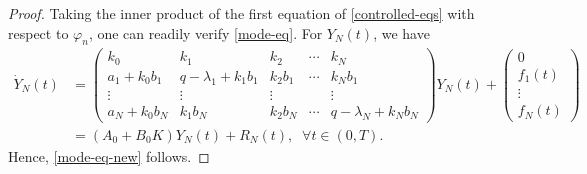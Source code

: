 \documentclass[review]{elsarticle}
\numberwithin{equation}{section}
\begin{document}
\begin{proof}
Taking the inner product of the first equation of \eqref{controlled-eqs} with respect to $\varphi_n$, one can readily verify \eqref{mode-eq}.
For $Y_N(t)$, we have
\begin{equation*}
\begin{aligned}
    \dot{Y}_N(t)&=\left(\begin{array}{ccccc}
k_0 & k_1 &k_2& \cdots &k_N \\
a_1+k_0b_1 &q-\lambda_1+k_1b_1&k_2b_1& \cdots & k_Nb_1 \\
\vdots  & \vdots &\vdots& & \vdots\\
a_N+k_0b_N&k_1b_N&k_2b_N&\cdots&q-\lambda_N+k_Nb_N
\end{array}\right){Y}_N(t)+\begin{pmatrix}
0\\
 f_1(t)\\
\vdots \\
 f_N(t)
\end{pmatrix}\\[2mm]
&=(A_0+B_0K)Y_N(t)+R_N(t),\;\;\forall t\in (0,T).
\end{aligned}
\end{equation*}
Hence, \eqref{mode-eq-new} follows.
\end{proof}
\end{document}
